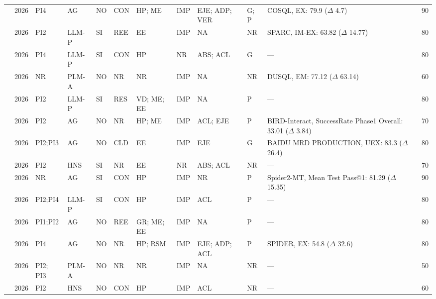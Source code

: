{\begin{longtable}{@{}l l l l l l l l l l p{4.4cm} r@{}}
\cite{Guo2026MTSQLR1} & 2026 & PI4 & AG & NO & CON & HP; ME & IMP & EJE; ADP; VER & G; P & COSQL, EX: 79.9 ($\Delta$ 4.7) & 90 \\
\cite{Zhou2026RoseSQL} & 2026 & PI2 & LLM-P & SI & REE & EE & IMP & NA & NR & SPARC, IM-EX: 63.82 ($\Delta$ 14.77) & 80 \\
\cite{Sarwar2026CLARITY} & 2026 & PI4 & LLM-P & SI & CON & HP & NR & ABS; ACL & G & --- & 80 \\
\cite{Bian2026ASTormer} & 2026 & NR & PLM-A & NO & NR & NR & IMP & NA & NR & DUSQL, EM: 77.12 ($\Delta$ 63.14) & 60 \\
\cite{Tummalapenta2026Memory} & 2026 & PI2 & LLM-P & SI & RES & VD; ME; EE & IMP & NA & P & --- & 80 \\
\cite{Wang2026Learning} & 2026 & PI2 & AG & NO & NR & HP; ME & IMP & ACL; EJE & P & BIRD-Interact, SuccessRate Phase1 Overall: 33.01 ($\Delta$ 3.84) & 70 \\
\cite{Lian2026CoeusBI} & 2026 & PI2;PI3 & AG & NO & CLD & EE & IMP & EJE & G & BAIDU MRD PRODUCTION, UEX: 83.3 ($\Delta$ 26.4) & 80 \\
\cite{Teixeira2026SemPlan} & 2026 & PI2 & HNS & SI & NR & EE & NR & ABS; ACL & NR & --- & 70 \\
\cite{Liu2026PLSQLBench} & 2026 & NR & AG & SI & CON & HP & IMP & NR & P & Spider2-MT, Mean Test Pass@1: 81.29 ($\Delta$ 15.35) & 90 \\
\cite{Liu2026Evaluating} & 2026 & PI2;PI4 & LLM-P & SI & CON & HP & IMP & ACL & P & --- & 80 \\
\cite{Yang2026GitHarness} & 2026 & PI1;PI2 & AG & NO & REE & GR; ME; EE & IMP & NA & P & --- & 80 \\
\cite{Yang2026HarnessSQL} & 2026 & PI4 & AG & NO & NR & HP; RSM & IMP & EJE; ADP; ACL & P & SPIDER, EX: 54.8 ($\Delta$ 32.6) & 80 \\
\cite{Chen2026SQL} & 2026 & PI2; PI3 & PLM-A & NO & NR & NR & IMP & NA & NR & --- & 50 \\
\cite{Khadija2026Intelligent} & 2026 & PI2 & HNS & NO & CON & HP & IMP & ACL & NR & --- & 60 \\
\end{longtable}
}
